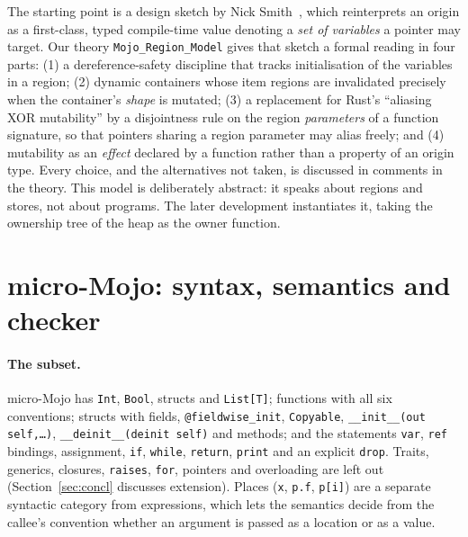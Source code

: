 \documentclass[11pt,a4paper]{article}
\newcommand{\micro}{micro-Mojo}
\newcommand{\code}[1]{\texttt{#1}}
\begin{document}
The starting point is a design sketch by Nick Smith~\cite{smith-gist}, which
reinterprets an origin as a first-class, typed compile-time value denoting a
\emph{set of variables} a pointer may target. Our theory
\code{Mojo\_Region\_Model} gives that sketch a formal reading in four parts:
(1) a dereference-safety discipline that tracks initialisation of the variables
in a region; (2) dynamic containers whose item regions are invalidated precisely
when the container's \emph{shape} is mutated; (3) a replacement for Rust's
``aliasing XOR mutability'' by a disjointness rule on the region \emph{parameters}
of a function signature, so that pointers sharing a region parameter may alias
freely; and (4) mutability as an \emph{effect} declared by a function rather than
a property of an origin type. Every choice, and the alternatives not taken, is
discussed in comments in the theory. This model is deliberately abstract: it
speaks about regions and stores, not about programs. The later development
instantiates it, taking the ownership tree of the heap as the owner function.

\section{\micro{}: syntax, semantics and checker}\label{sec:formal}

\paragraph{The subset.}
\micro{} has \code{Int}, \code{Bool}, structs and \code{List[T]}; functions with
all six conventions; structs with fields, \code{@fieldwise\_init},
\code{Copyable}, \code{\_\_init\_\_(out self,\ldots)}, \code{\_\_deinit\_\_(deinit
self)} and methods; and the statements \code{var}, \code{ref} bindings,
assignment, \code{if}, \code{while}, \code{return}, \code{print} and an explicit
\code{drop}. Traits, generics, closures, \code{raises}, \code{for}, pointers and
overloading are left out (Section~\ref{sec:concl} discusses extension).
Places (\code{x}, \code{p.f}, \code{p[i]}) are a separate syntactic category
from expressions, which lets the semantics decide from the callee's convention
whether an argument is passed as a location or as a value.
\end{document}
